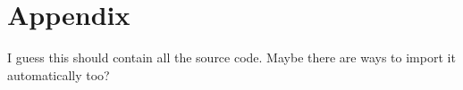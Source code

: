 \chapter{Appendix}
I guess this should contain all the source code. Maybe there are ways to import it automatically too?